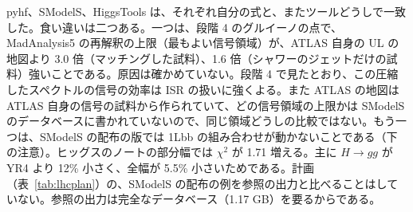 \documentclass[a4paper,10pt]{ltjsarticle}
\begin{document}
pyhf、SModelS、HiggsTools は、それぞれ自分の式と、またツールどうしで一致した。食い違いは二つある。一つは、段階 4 のグルイーノの点で、MadAnalysis5 の再解釈の上限（最もよい信号領域）が、ATLAS 自身の UL の地図より 3.0 倍（マッチングした試料）、1.6 倍（シャワーのジェットだけの試料）強いことである。原因は確かめていない。段階 4 で見たとおり、この圧縮したスペクトルの信号の効率は ISR の扱いに強くよる。また ATLAS の地図は ATLAS 自身の信号の試料から作られていて、どの信号領域の上限かは SModelS のデータベースに書かれていないので、同じ領域どうしの比較ではない。もう一つは、SModelS の配布の版では 1Lbb の組み合わせが動かないことである（下の注意）。ヒッグスのノートの部分幅では $\chi^2$ が 1.71 増える。主に $H\to gg$ が YR4 より 12\% 小さく、全幅が 5.5\% 小さいためである。計画（表~\ref{tab:lhcplan}）の、SModelS の配布の例を参照の出力と比べることはしていない。参照の出力は完全なデータベース（1.17 GB）を要るからである。
\end{document}
